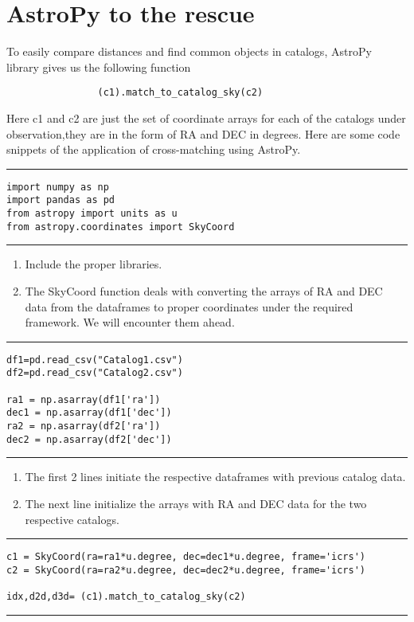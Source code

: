 \documentclass{article}
\begin{document}
\section{AstroPy to the rescue}
To easily compare distances and find common objects in catalogs, AstroPy library gives us the following function
                \begin{verbatim}
                (c1).match_to_catalog_sky(c2)
                \end{verbatim}
Here c1 and c2 are just the set of coordinate arrays for each of the catalogs under observation,they are in the form of RA and DEC in degrees.
Here are some code snippets of the application of cross-matching using AstroPy.
\medskip
\hrule
\begin{lstlisting}
import numpy as np
import pandas as pd
from astropy import units as u
from astropy.coordinates import SkyCoord
\end{lstlisting}
\hrule
\medskip
\begin{enumerate}
\color{red}
\item Include the proper libraries.
\item The SkyCoord function deals with converting the arrays of RA and DEC data from the dataframes to proper coordinates under the required framework.
We will encounter them ahead.
\end{enumerate}
\medskip
\hrule
\medskip
\begin{lstlisting}
df1=pd.read_csv("Catalog1.csv")
df2=pd.read_csv("Catalog2.csv")

ra1 = np.asarray(df1['ra'])
dec1 = np.asarray(df1['dec'])
ra2 = np.asarray(df2['ra'])
dec2 = np.asarray(df2['dec'])
\end{lstlisting}
\medskip
\hrule
\medskip
\begin{enumerate}
    \color{red}
    \item The first 2 lines initiate the respective dataframes with previous catalog data.
    \item The next line initialize the arrays with RA and DEC data for the two respective catalogs.
\end{enumerate}
\medskip
\hrule
\medskip
\begin{lstlisting}
c1 = SkyCoord(ra=ra1*u.degree, dec=dec1*u.degree, frame='icrs')
c2 = SkyCoord(ra=ra2*u.degree, dec=dec2*u.degree, frame='icrs')

idx,d2d,d3d= (c1).match_to_catalog_sky(c2)
\end{lstlisting}
\medskip
\hrule
\medskip
\end{document}
